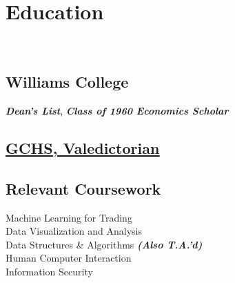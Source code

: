 \documentclass[]{deedy-resume-openfont}
\begin{document}
%
%


%
%

\begin{minipage}[t]{0.31\textwidth}


\section{Education}
\\[1\baselineskip]

\subsection{Williams College}
{\footnotesize \textit{\textbf{Dean's List}}}, {\footnotesize \textit{\textbf{Class of 1960 Economics Scholar}}}
\sectionsep

\subsection{\underline{\href{https://patch.com/new-york/glencove/meet-glen-coves-valedictorian-rahul-nath}{\color{blue}GCHS, Valedictorian}}}
\sectionsep

\subsection{Relevant Coursework}
Machine Learning for Trading \\
Data Visualization and Analysis \\
Data Structures \& Algorithms {\footnotesize \textit{\textbf{(Also T.A.'d) }}} \\
Human Computer Interaction \\
Information Security \\


\end{minipage}
\end{document}

